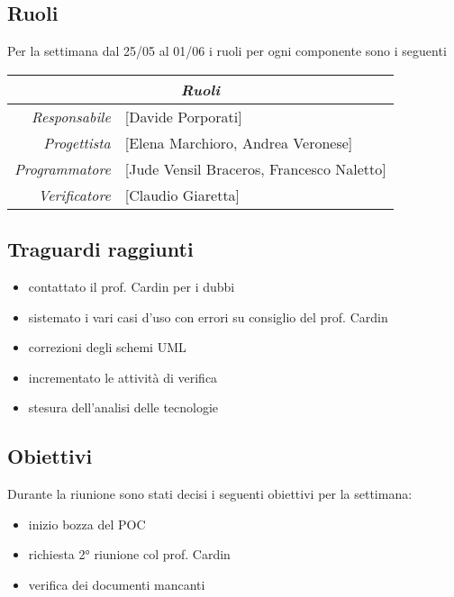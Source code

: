 \documentclass[12pt]{article}
\begin{document}
\subsection{Ruoli}
Per la settimana dal 25/05 al 01/06 i ruoli per ogni componente sono i seguenti
\\
\begin{tabular}{r | l}
    \multicolumn{2}{c}{\textit{Ruoli}}\\
    \hline
        \textit{Responsabile} &
        [Davide Porporati]\makecell{}\\
        \textit{Progettista} &
        [Elena Marchioro, Andrea Veronese]\makecell{}\\
        \textit{Programmatore} &
        [Jude Vensil Braceros, Francesco Naletto]\makecell{}\\
        \textit{Verificatore} & 
        [Claudio Giaretta]\makecell{}\\
\end{tabular}

\subsection{Traguardi raggiunti}
\begin{itemize}
    \item contattato il prof. Cardin per i dubbi
    \item sistemato i vari casi d’uso con errori su consiglio del prof. Cardin
    \item correzioni degli schemi UML
    \item incrementato le attività di verifica
    \item stesura dell’analisi delle tecnologie 
\end{itemize}

\subsection{Obiettivi}
Durante la riunione sono stati decisi i seguenti obiettivi per la settimana:
\begin{itemize}
    \item inizio bozza del POC
    \item richiesta 2° riunione col prof. Cardin
    \item verifica dei documenti mancanti
\end{itemize}
\end{document}
